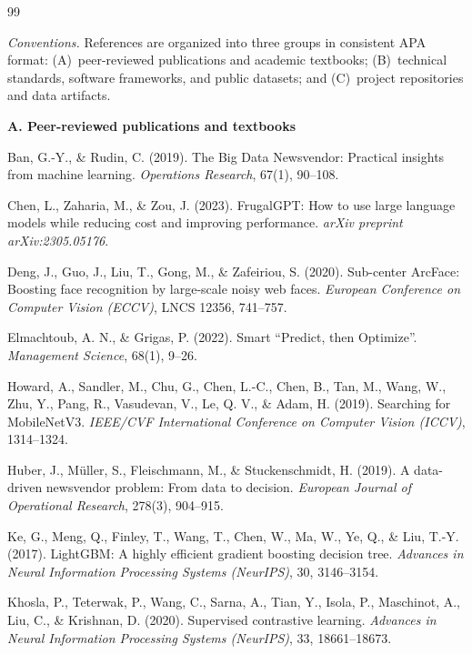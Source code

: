 \begin{thebibliography}{99}

\item[]\hspace*{-\leftmargin}\textit{Conventions.} References are organized into three groups in consistent APA format: (A)~peer-reviewed publications and academic textbooks; (B)~technical standards, software frameworks, and public datasets; and (C)~project repositories and data artifacts.

\item[]\hspace*{-\leftmargin}\textbf{A. Peer-reviewed publications and textbooks}

Ban, G.-Y., \& Rudin, C. (2019).
The Big Data Newsvendor: Practical insights from machine learning.
\textit{Operations Research}, 67(1), 90--108.

Chen, L., Zaharia, M., \& Zou, J. (2023).
FrugalGPT: How to use large language models while reducing cost and improving performance.
\textit{arXiv preprint arXiv:2305.05176}.

Deng, J., Guo, J., Liu, T., Gong, M., \& Zafeiriou, S. (2020).
Sub-center ArcFace: Boosting face recognition by large-scale noisy web faces.
\textit{European Conference on Computer Vision (ECCV)}, LNCS 12356, 741--757.

Elmachtoub, A. N., \& Grigas, P. (2022).
Smart ``Predict, then Optimize''.
\textit{Management Science}, 68(1), 9--26.

Howard, A., Sandler, M., Chu, G., Chen, L.-C., Chen, B., Tan, M., Wang, W., Zhu, Y., Pang, R., Vasudevan, V., Le, Q. V., \& Adam, H. (2019).
Searching for MobileNetV3.
\textit{IEEE/CVF International Conference on Computer Vision (ICCV)}, 1314--1324.

Huber, J., M\"uller, S., Fleischmann, M., \& Stuckenschmidt, H. (2019).
A data-driven newsvendor problem: From data to decision.
\textit{European Journal of Operational Research}, 278(3), 904--915.

Ke, G., Meng, Q., Finley, T., Wang, T., Chen, W., Ma, W., Ye, Q., \& Liu, T.-Y. (2017).
LightGBM: A highly efficient gradient boosting decision tree.
\textit{Advances in Neural Information Processing Systems (NeurIPS)}, 30, 3146--3154.

Khosla, P., Teterwak, P., Wang, C., Sarna, A., Tian, Y., Isola, P., Maschinot, A., Liu, C., \& Krishnan, D. (2020).
Supervised contrastive learning.
\textit{Advances in Neural Information Processing Systems (NeurIPS)}, 33, 18661--18673.


\end{thebibliography}
